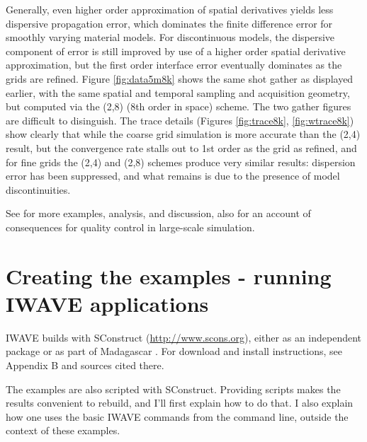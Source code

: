 Generally, even higher order approximation of spatial derivatives
yields less dispersive propagation error, which dominates the finite
difference error for smoothly varying material models. For
discontinuous models, the dispersive component of error is still
improved by use of a higher order spatial derivative approximation,
but the first order interface error eventually dominates as the grids
are refined. Figure \ref{fig:data5m8k} shows the same shot gather as
displayed earlier, with the same spatial and temporal sampling and
acquisition geometry, but computed via the (2,8) (8th order in space)
scheme. The two gather figures are difficult to disinguish. The trace
details (Figures \ref{fig:trace8k}, \ref{fig:wtrace8k}) show clearly
that while the coarse grid simulation is more accurate than the (2,4)
result, but the convergence rate stalls out to 1st order as the grid
as refined, and for fine grids the (2,4) and (2,8) schemes produce
very similar results: dispersion error has been suppressed, and what
remains is due to the presence of model discontinuities.

See
\cite[]{SymesVdovina:09} for more examples, analysis, and discussion,
also \cite[]{FehlerKeliher:2011} for an account of consequences for quality control in
large-scale simulation.

\section{Creating the examples - running IWAVE applications}
IWAVE builds with SConstruct (\url{http://www.scons.org}), either as an
independent package or as part of Madagascar \cite[]{Madagascar}. For
download and install instructions, see Appendix B and sources cited
there.

The examples are also scripted with SConstruct. Providing scripts
makes the results convenient to rebuild, and I'll first explain how to do
that. I also explain how one uses the basic IWAVE commands from
the command line, outside the context of these examples.

